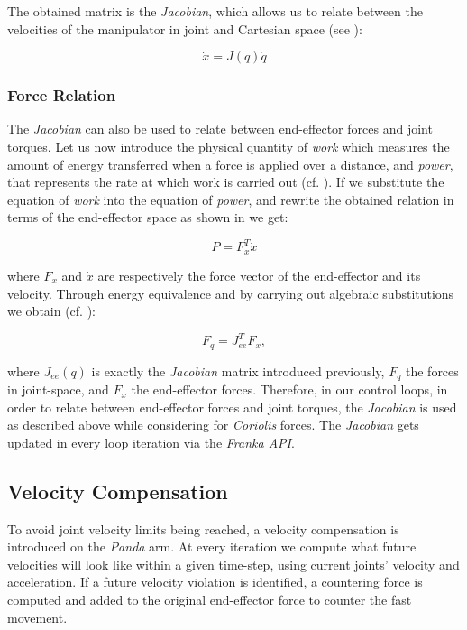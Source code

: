 \documentclass[runningheads]{llncs}
\begin{document}
The obtained matrix is the \textit{Jacobian}, which allows us to relate between the velocities of the manipulator in joint and Cartesian space (see \cite{itr}):

\begin{equation}
\label{eqn:jacobian_relation}
\dot{x} = J(q) \dot{q}
\end{equation}

\subsubsection{Force Relation}

The \textit{Jacobian} can also be used to relate between end-effector forces and joint torques. Let us now introduce the physical quantity of \textit{work} which measures the amount of energy transferred when a force is applied over a distance, and \textit{power}, that represents the rate at which work is carried out (cf. \cite{rrl}). If we substitute the equation of \textit{work} into the equation of \textit{power}, and rewrite the obtained relation in terms of the end-effector space as shown in \cite{itr} we get:

\begin{equation}
\label{eqn:ee_eq}
P = F_x^T \dot{x}
\end{equation}

where $F_x$ and $\dot{x}$ are respectively the force vector of the end-effector and its velocity. Through energy equivalence and by carrying out algebraic substitutions we obtain (cf. \cite{rrl}):

\begin{equation}
\label{eqn:step4}
F_q = J_{ee}^T F_x,
\end{equation}

where $J_{ee}(q)$ is exactly the \textit{Jacobian} matrix introduced previously, $F_q$ the forces in joint-space, and $F_x$ the end-effector forces. Therefore, in our control loops, in order to relate between end-effector forces and joint torques, the \textit{Jacobian} is used as described above while considering for \textit{Coriolis} forces. The \textit{Jacobian} gets updated in every loop iteration via the \textit{Franka API}.

\subsection{Velocity Compensation}

To avoid joint velocity limits being reached, a velocity compensation is introduced on the \textit{Panda} arm. At every iteration we compute what future velocities will look like within a given time-step, using current joints' velocity and acceleration. If a future velocity violation is identified, a countering force is computed and added to the original end-effector force to counter the fast movement.
\end{document}
